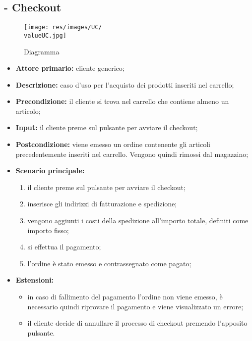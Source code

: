 \subsection{ - Checkout}
\begin{figure}[H]
    \centering
    \texttt{[image: res/images/UC/\\valueUC.jpg]}
    \caption{Diagramma }
\end{figure}
\begin{itemize}
    \item \textbf{Attore primario:} cliente generico;
    \item \textbf{Descrizione:} caso d'uso per l'acquisto dei prodotti inseriti nel carrello;
    \item \textbf{Precondizione:} il cliente si trova nel carrello che contiene almeno un articolo;
    \item \textbf{Input:} il cliente preme sul pulsante per avviare il checkout;
    \item \textbf{Postcondizione:} viene emesso un ordine contenente gli articoli precedentemente inseriti nel carrello. Vengono quindi rimossi dal magazzino;
    \item \textbf{Scenario principale:}
          \begin{enumerate}
              \item il cliente preme sul pulsante per avviare il checkout;
              \item inserisce gli indirizzi di fatturazione e spedizione;
              \item vengono aggiunti i costi della spedizione all'importo totale, definiti come importo fisso;
              \item si effettua il pagamento;
              \item l'ordine è stato emesso e contrassegnato come pagato;
          \end{enumerate}
    \item \textbf{Estensioni:}
          \begin{itemize}
              \item in caso di fallimento del pagamento l'ordine non viene emesso, è necessario quindi riprovare il pagamento e viene visualizzato un errore;
              \item il cliente decide di annullare il processo di checkout premendo l'apposito pulsante.
          \end{itemize}
\end{itemize}

